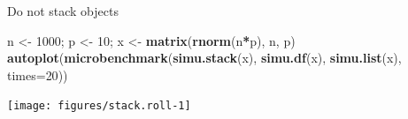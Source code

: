 \documentclass[10pt,ignorenonframetext,]{beamer}
\newenvironment{Shaded}{\begin{snugshade}}{\end{snugshade}}
\newcommand{\KeywordTok}[1]{\textcolor[rgb]{0.13,0.29,0.53}{\textbf{#1}}}
\newcommand{\DataTypeTok}[1]{\textcolor[rgb]{0.13,0.29,0.53}{#1}}
\newcommand{\DecValTok}[1]{\textcolor[rgb]{0.00,0.00,0.81}{#1}}
\newcommand{\StringTok}[1]{\textcolor[rgb]{0.31,0.60,0.02}{#1}}
\newcommand{\OperatorTok}[1]{\textcolor[rgb]{0.81,0.36,0.00}{\textbf{#1}}}
\newcommand{\NormalTok}[1]{#1}
\begin{document}
\begin{frame}{Do not stack objects}
\normalsize

\scriptsize

\begin{Shaded}
\begin{Highlighting}[]
\NormalTok{n <-}\StringTok{ }\DecValTok{1000}\NormalTok{; p <-}\StringTok{ }\DecValTok{10}\NormalTok{; x <-}\StringTok{ }\KeywordTok{matrix}\NormalTok{(}\KeywordTok{rnorm}\NormalTok{(n}\OperatorTok{*}\NormalTok{p), n, p)}
\KeywordTok{autoplot}\NormalTok{(}\KeywordTok{microbenchmark}\NormalTok{(}\KeywordTok{simu.stack}\NormalTok{(x), }\KeywordTok{simu.df}\NormalTok{(x), }\KeywordTok{simu.list}\NormalTok{(x), }\DataTypeTok{times=}\DecValTok{20}\NormalTok{))}
\end{Highlighting}
\end{Shaded}

\begin{center}\texttt{[image: figures/stack.roll-1]} \end{center}

\normalsize

\end{frame}
\end{document}
